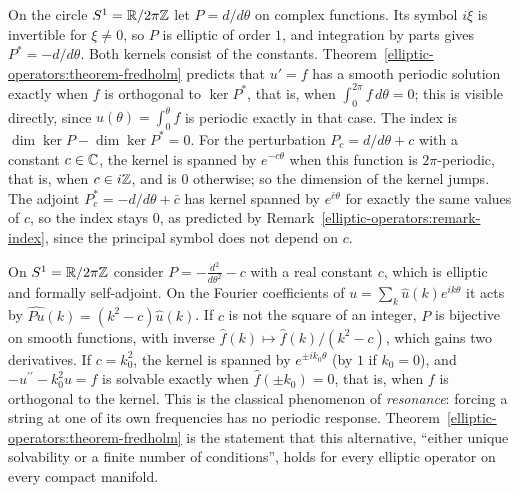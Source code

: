 \begin{example}\label{elliptic-operators:example-circle-derivative}
On the circle $S^1 = \mathbb{R}/2\pi\mathbb{Z}$ let $P = d/d\theta$ on complex functions. Its symbol $i\xi$ is invertible for $\xi \neq 0$, so $P$ is elliptic of order $1$, and integration by parts gives $P^* = -d/d\theta$. Both kernels
consist of the constants. Theorem~\ref{elliptic-operators:theorem-fredholm} predicts that $u' = f$ has a smooth periodic solution exactly when $f$ is orthogonal to $\ker P^*$, that is, when $\int_0^{2\pi}f\,d\theta = 0$; this
is visible directly, since $u(\theta) = \int_0^\theta f$ is periodic exactly in that case. The index is $\dim\ker P - \dim\ker P^* = 0$. For the perturbation $P_c = d/d\theta + c$ with a constant $c \in \mathbb{C}$, the kernel is
spanned by $e^{-c\theta}$ when this function is $2\pi$-periodic, that is, when $c \in i\mathbb{Z}$, and is $0$ otherwise; so the dimension of the kernel jumps. The adjoint $P_c^* = -d/d\theta + \bar c$ has kernel spanned by $e^{\bar c\theta}$ for exactly the same values of $c$, so the index stays $0$,
as predicted by Remark~\ref{elliptic-operators:remark-index}, since the principal symbol does not depend on $c$.
\end{example}

\begin{example}\label{elliptic-operators:example-fredholm-alternative}
On $S^1 = \mathbb{R}/2\pi\mathbb{Z}$ consider $P = -\frac{d^2}{d\theta^2} - c$ with a real constant $c$, which is elliptic and formally self-adjoint. On the Fourier coefficients of $u = \sum_k\hat u(k)e^{ik\theta}$ it acts by
$\widehat{Pu}(k) = (k^2 - c)\hat u(k)$. If $c$ is not the square of an integer, $P$ is bijective on smooth functions, with inverse $\hat f(k) \mapsto \hat f(k)/(k^2 - c)$, which gains two derivatives. If
$c = k_0^2$, the kernel is spanned by $e^{\pm ik_0\theta}$ (by $1$ if $k_0 = 0$), and $-u^{\prime\prime} - k_0^2u = f$ is solvable exactly when $\hat f(\pm k_0) = 0$, that is, when $f$ is orthogonal to the kernel. This is
the classical phenomenon of \emph{resonance}: forcing a string at one of its own frequencies has no periodic response. Theorem~\ref{elliptic-operators:theorem-fredholm} is the statement that this
alternative, ``either unique solvability or a finite number of conditions'', holds for every elliptic operator on every compact manifold.
\end{example}

